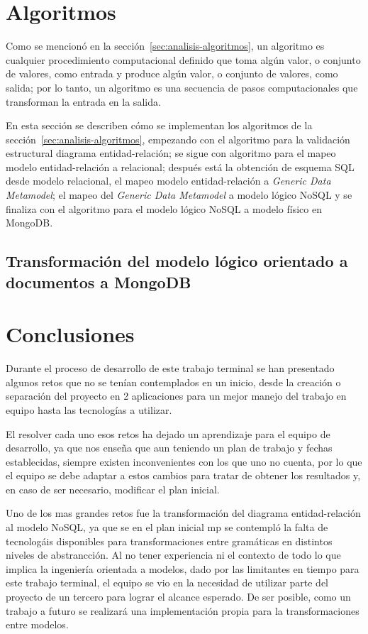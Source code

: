 \section{Algoritmos}
Como se mencionó en la sección~\ref{sec:analisis-algoritmos}, un algoritmo es cualquier procedimiento computacional definido que toma algún valor, o conjunto de valores, como entrada y produce algún valor, o conjunto de valores, como salida; por lo tanto, un algoritmo es una secuencia de pasos computacionales que transforman la entrada en la salida.


En esta sección se describen cómo se implementan los algoritmos de la sección~\ref{sec:analisis-algoritmos}, empezando con el algoritmo para la validación estructural diagrama entidad-relación; se sigue con algoritmo para el mapeo modelo entidad-relación a relacional; después está la obtención de esquema SQL desde modelo relacional, el mapeo modelo entidad-relación a \textit{Generic Data Metamodel}; el mapeo del \textit{Generic Data Metamodel} a modelo lógico NoSQL y se finaliza con el algoritmo para el modelo lógico NoSQL a modelo físico en MongoDB.




\subsection{Transformación del modelo lógico orientado a documentos a MongoDB}


\section{Conclusiones}
Durante el proceso de desarrollo de este trabajo terminal se han presentado algunos retos que no se tenían contemplados en un inicio, desde la creación o separación del proyecto en 2 aplicaciones para un mejor manejo del trabajo en equipo hasta las tecnologías a utilizar. 

El resolver cada uno esos retos ha dejado un aprendizaje para el equipo de desarrollo, ya que nos enseña que aun teniendo un plan de trabajo y fechas establecidas, siempre existen inconvenientes con los que uno no cuenta, por lo que el equipo se debe adaptar a estos cambios para tratar de obtener los resultados y, en caso de ser necesario, modificar el plan inicial.

Uno de los mas grandes retos fue la transformación del diagrama entidad-relación al modelo NoSQL, ya que se en el plan inicial mp se contempló la falta de tecnologáis disponibles para transformaciones entre gramáticas en distintos niveles de abstrancción. Al no tener experiencia ni el contexto de todo lo que implica la ingeniería orientada a modelos, dado por las limitantes en tiempo para este trabajo terminal, el equipo se vio en la necesidad de utilizar parte del proyecto de un tercero para lograr el alcance esperado. De ser posible, como un trabajo a futuro se realizará una implementación propia para la transformaciones entre modelos. 